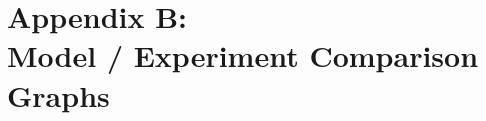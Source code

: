 \chapter[Appendix B:  Model / Experiment Comparison Graphs]{Appendix B:  \\
Model / Experiment Comparison Graphs}\label{sec:Graphs}


\clearpage

